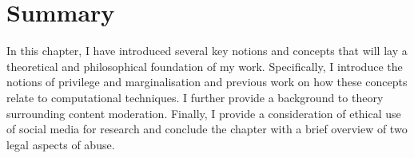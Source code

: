 \section{Summary}
In this chapter, I have introduced several key notions and concepts that will lay a theoretical and philosophical foundation of my work.
Specifically, I introduce the notions of privilege and marginalisation and previous work on how these concepts relate to computational techniques. I further provide a background to theory surrounding content moderation. Finally, I provide a consideration of ethical use of social media for research and conclude the chapter with a brief overview of two legal aspects of abuse.

